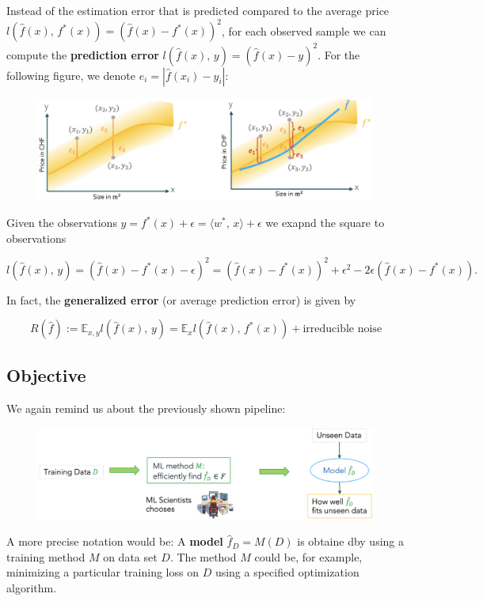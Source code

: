 \documentclass[a4paper]{extarticle}
\begin{document}
Instead of the estimation error that is predicted compared to the average price \(l(\hat{f}(x), \, f^*(x)) = (\hat{f}(x) - f^*(x))^2\), for each observed sample we can compute the \textbf{prediction error} \(l(\hat{f}(x), \, y) = (\hat{f}(x)-y)^2\). For the following figure, we denote \(e_i = |\hat{f}(x_i)-y_i|\):

\begin{figure}[H]
    \includegraphics[width=15cm]{../images/IntroML_Fig3-2}
    \centering
\end{figure}

Given the observations \(y = f^*(x) + \epsilon = \langle w^*, \, x \rangle + \epsilon\) we exapnd the square to observations

\[
    l(\hat{f}(x), \, y) = (\hat{f}(x) - f^*(x) - \epsilon)^2 = (\hat{f}(x) - f^*(x))^2 + \epsilon^2 - 2\epsilon(\hat{f}(x) - f^*(x)).
\]

In fact, the \textbf{generalized error} (or average prediction error) is given by

\[
    R(\hat{f}) := \mathbb{E}_{x,y}l(\hat{f}(x), \, y) = \mathbb{E}_xl(\hat{f}(x), \, f^*(x)) + \text{irreducible noise}
\]

\subsection{Objective}

We again remind us about the previously shown pipeline:

\begin{figure}[H]
    \includegraphics[width=15cm]{../images/IntroML_Fig3-3}
    \centering
\end{figure}

A more precise notation would be: A \textbf{model} \(\hat{f}_D = M(D)\) is obtaine dby using a training method \(M\) on data set \(D\). The  method \(M\) could be, for example, minimizing a particular training loss on \(D\) using a specified optimization algorithm.
\end{document}
